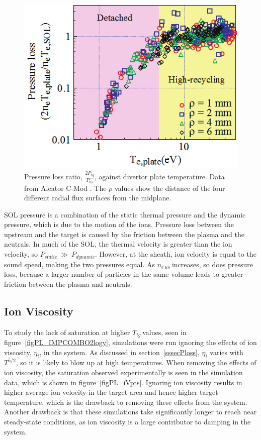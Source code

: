 \documentclass[12pt]{article}  %
\providecommand{\neus}{$n_{e~us}~$} %
\providecommand{\Ttg}{$T_{tg}~$} %
\begin{document}
\begin{figure}
\includegraphics[scale=0.7]{Figures/PlossAlcator.png}
\centering
\caption{Pressure loss ratio, $\frac{2P_{tg}}{P_{us}}$, against divertor plate temperature. Data from Alcator C-Mod \cite{Lipschultz2007}. The $\rho $ values show the distance of the four different radial flux surfaces from the midplane.}\label{figPlossAlcator}
\end{figure}

SOL pressure is a combination of the static thermal pressure and the dynamic pressure, which is due to the motion of the ions. Pressure loss between the upstream and the target is caused by the friction between the plasma and the neutrals. In much of the SOL, the thermal velocity is greater than the ion velocity, so $P_{static}~\gg~P_{dynamic}$. However, at the sheath, ion velocity is equal to the sound speed, making the two pressures equal. As \neus increases, so does pressure loss, because a larger number of particles in the same volume leads to greater friction between the plasma and neutrals.


\subsection{Ion Viscosity}\label{ssecIonviscosity}
To study the lack of saturation at higher \Ttg values, seen in figure~\ref{figPL_IMPCOMBO2logy}, simulations were run ignoring the effects of ion viscosity, $\eta_i$, in the system. As discussed in section~\ref{sssecPloss}, $\eta_i$ varies with $T^{5/2}$, so it is likely to blow up at high temperatures. When removing the effects of ion viscosity, the saturation observed experimentally is seen in the simulation data, which is shown in figure~\ref{figPL_iVpts}. Ignoring ion viscosity results in higher average ion velocity in the target area and hence higher target temperature, which is the drawback to removing these effects from the system. Another drawback is that these simulations take significantly longer to reach near steady-state conditions, as ion viscosity is a large contributor to damping in the system.
\end{document}
